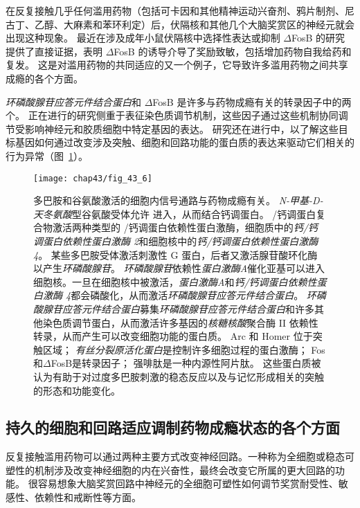在反复接触几乎任何滥用药物（包括可卡因和其他精神运动兴奋剂、鸦片制剂、尼古丁、乙醇、大麻素和苯环利定）后，伏隔核和其他几个大脑奖赏区的神经元就会出现这种现象。
最近在涉及成年小鼠伏隔核中选择性表达或抑制 $\Delta$FosB 的研究提供了直接证据，表明 $\Delta$FosB 的诱导介导了奖励致敏，包括增加药物自我给药和复发。
这是对滥用药物的共同适应的又一个例子，它导致许多滥用药物之间共享成瘾的各个方面。


\textit{环磷酸腺苷应答元件结合蛋白}和 $\Delta$FosB 是许多与药物成瘾有关的转录因子中的两个。
正在进行的研究侧重于表征染色质调节机制，这些因子通过这些机制协同调节受影响神经元和胶质细胞中特定基因的表达。
研究还在进行中，以了解这些目标基因如何通过改变涉及突触、细胞和回路功能的蛋白质的表达来驱动它们相关的行为异常（图~\ref{fig:43_6}）。


\begin{figure}[htbp]
	\centering
	\texttt{[image: chap43/fig\_43\_6]}
	\caption{多巴胺和谷氨酸激活的细胞内信号通路与药物成瘾有关。
		\textit{N-甲基-D-天冬氨酸}型谷氨酸受体允许  进入，从而结合钙调蛋白。
		/钙调蛋白复合物激活两种类型的 /钙调蛋白依赖性蛋白激酶，细胞质中的\textit{钙/钙调蛋白依赖性蛋白激酶 2}和细胞核中的\textit{钙/钙调蛋白依赖性蛋白激酶 4}。
		某些多巴胺受体激活刺激性 G 蛋白，后者又激活腺苷酸环化酶以产生\textit{环磷酸腺苷}。
		\textit{环磷酸腺苷}依赖性\textit{蛋白激酶A}催化亚基可以进入细胞核。一旦在细胞核中被激活，\textit{蛋白激酶A}和\textit{钙/钙调蛋白依赖性蛋白激酶 4}都会磷酸化，从而激活\textit{环磷酸腺苷应答元件结合蛋白}。
		\textit{环磷酸腺苷应答元件结合蛋白}募集\textit{环磷酸腺苷应答元件结合蛋白}和许多其他染色质调节蛋白，从而激活许多基因的\textit{核糖核酸}聚合酶 II 依赖性转录，从而产生可以改变细胞功能的蛋白质。
		Arc 和 Homer 位于突触区域；
		\textit{有丝分裂原活化蛋白}是控制许多细胞过程的蛋白激酶；
		Fos和$\Delta$FosB是转录因子；
		强啡肽是一种内源性阿片肽。
		这些蛋白质被认为有助于对过度多巴胺刺激的稳态反应以及与记忆形成相关的突触的形态和功能变化。}
	\label{fig:43_6}
\end{figure}



\subsection{持久的细胞和回路适应调制药物成瘾状态的各个方面}

反复接触滥用药物可以通过两种主要方式改变神经回路。一种称为全细胞或稳态可塑性的机制涉及改变神经细胞的内在兴奋性，最终会改变它所属的更大回路的功能。
很容易想象大脑奖赏回路中神经元的全细胞可塑性如何调节奖赏耐受性、敏感性、依赖性和戒断性等方面。


